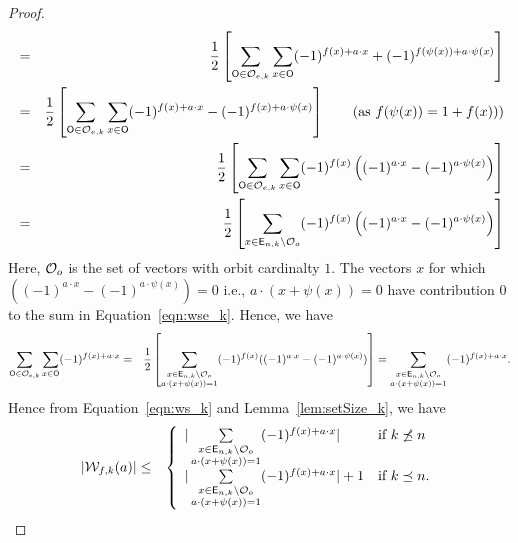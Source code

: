 \documentclass{llncs}
\begin{document}
\begin{proof}
\begin{eqnarray*}
& = & \frac{1}{2} \left[ \sum_{\mathsf{O} \in \mathcal{O}_{e,k}} \sum_{x \in \mathsf{O}} (-1)^{ f(x) + a \cdot x} + (-1)^{f(\psi(x))+ a \cdot \psi(x)}   \right]  \nonumber \\
& = & \frac{1}{2}  \left[ \sum_{\mathsf{O} \in \mathcal{O}_{e,k}} \sum_{x \in \mathsf{O}} (-1)^{ f(x) + a \cdot x} - (-1)^{f(x) + a \cdot \psi(x)}   \right] ~~~~~~(\text{as }f(\psi(x)) = 1+f(x)))   \nonumber \\
& = & \frac{1}{2} \left[ \sum_{\mathsf{O} \in \mathcal{O}_{e,k}} \sum_{x \in \mathsf{O}} (-1)^{ f(x)} \left((-1)^{a \cdot x} - (-1)^{ a \cdot \psi(x)}\right) \right] \nonumber \\
& = & \frac{1}{2} \left[ \sum_{x \in \mathsf{E}_{n,k} \setminus \mathcal{O}_o} (-1)^{ f(x)} \left((-1)^{a \cdot x} - (-1)^{ a \cdot \psi(x)}\right) \right]
\end{eqnarray*}
Here, $\mathcal{O}_o$ is the set of vectors with orbit cardinalty $1$. The vectors $x$ for which $((-1)^{ a \cdot x} - (-1)^{a \cdot \psi(x)}) = 0$ i.e., $a \cdot (x + \psi(x))= 0$ have contribution $0$ to the sum in Equation~\ref{eqn:wse_k}. Hence, we have
\begin{eqnarray*}
\sum_{\mathsf{O} \in \mathcal{O}_{e,k}} \sum_{x \in \mathsf{O}} (-1)^{ f(x) + a \cdot x} 
& = & \frac{1}{2} \left[ \sum_{\substack{x \in \mathsf{E}_{n,k} \setminus \mathcal{O}_o \\ a \cdot (x + \psi(x))= 1}} (-1)^{f(x)} ((-1)^{ a \cdot x} - (-1)^{a \cdot \psi(x)})  \right] 
=  \sum_{\substack{x \in \mathsf{E}_{n,k} \setminus \mathcal{O}_o \\ a \cdot (x + \psi(x))= 1}} (-1)^{f(x)+ a \cdot x}. 
\end{eqnarray*}
Hence from Equation~\ref{eqn:ws_k} and Lemma~\ref{lem:setSize_k}, we have
\begin{eqnarray}\label{eqn:ws_k1}
|\wtk{f}{k}(a)| & \leq & \left\{\begin{array}{ll}
    |\sum\limits_{\substack{x \in \Ekn{n}{k} \setminus \orbs_o \\ a \cdot (x + \psi(x))= 1}} (-1)^{f(x)+ a \cdot x}| & \text{if } k \not\preceq n\\
    |\sum\limits_{\substack{x \in \Ekn{n}{k} \setminus \orbs_o \\ a \cdot (x + \psi(x))= 1}} (-1)^{f(x)+ a \cdot x}| + 1 & \text{if } k \preceq n.
    \end{array}\right. \nonumber\\

\end{eqnarray}
\end{proof}
\end{document}
